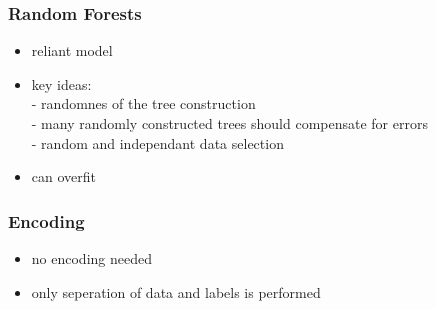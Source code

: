 \documentclass{beamer}
\begin{document}
\begin{frame}
\frametitle{Random Forests}
\begin{itemize}
\item{reliant model}
\item{key ideas:\\ - randomnes of the tree construction\\ - many randomly constructed trees should compensate for errors \\ - random and independant data selection}
\item{can overfit}
\end{itemize}
\end{frame}

\begin{frame}
\frametitle{Encoding}
\begin{itemize}
\item{no encoding needed}
\item{only seperation of data and labels is performed}
\end{itemize}
\end{frame}
\end{document}
